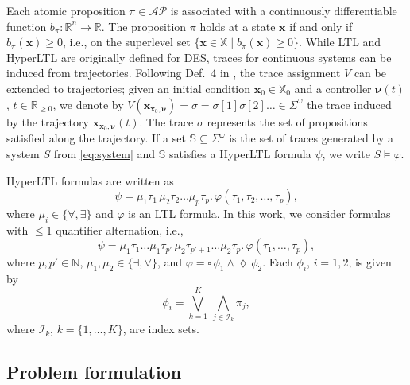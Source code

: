 \documentclass[letterpaper, 10 pt, conference]{ieeeconf}  %
\begin{document}
Each atomic proposition $\pi \in \mathcal{AP}$ is associated with a continuously differentiable function $b_\pi: \mathbb{R}^n \to \mathbb{R}$. The proposition $\pi$ holds at a state $\mathbf{x}$ if and only if $b_\pi(\mathbf{x}) \ge 0$, i.e., on the superlevel set $\{\mathbf{x} \in \mathbb{X} \mid b_\pi(\mathbf{x}) \ge 0 \}$. While LTL and HyperLTL are originally defined for DES, traces for continuous systems can be induced from trajectories. Following Def.~4 in \cite{kloetzer2008}, the trace assignment $V$ can be extended to trajectories; given an initial condition $\mathbf{x}_0 \in \mathbb{X}_0$ and a controller $\boldsymbol{\nu}(t)$, $t \in \mathbb{R}_{\ge 0}$, we denote by $V(\mathbf{x}_{\mathbf{x}_0, \boldsymbol{\nu}}) = \sigma = \sigma[1] \sigma[2] \dots \in \Sigma^\omega$ the trace induced by the trajectory $\mathbf{x}_{\mathbf{x}_0, \boldsymbol{\nu}}(t)$. The trace $\sigma$ represents the set of propositions satisfied along the trajectory. If a set $\mathbb{S} \subseteq \Sigma^\omega$ is the set of traces generated by a system $S$ from \eqref{eq:system} and $\mathbb{S}$ satisfies a HyperLTL formula $\psi$, we write $S \models \varphi$.

HyperLTL formulas are written as
\begin{equation*} 
    \psi = \mu_1 \tau_1 \, \mu_2 \tau_2 \dots \mu_p \tau_p. \, \varphi(\tau_1, \tau_2, \dots, \tau_p), 
\end{equation*}
where $\mu_i \in \{\forall, \exists\}$ and $\varphi$ is an LTL formula. In this work, we consider formulas with $\le 1$ quantifier alternation, i.e.,  
\begin{equation} \label{eq:hyperltl_formula}
    \psi = \mu_1 \tau_1  \dots \mu_1 \tau_{p'} \, \mu_2 \tau_{p'+1} \dots \mu_2 \tau_p. \, \varphi(\tau_1, \dots, \tau_p), 
\end{equation}
where $p, p' \in \mathbb{N}$, $\mu_1, \mu_2 \in \{\exists, \forall \}$, and $\varphi = \square \, \phi_1 \land \lozenge \, \phi_2$. Each $\phi_i$, $i = 1,2$, is given by
\begin{equation} \label{eq:hyperltl_subformula}
    \phi_i = \bigvee_{k=1}^K \, \bigwedge_{j \in \mathcal{I}_k} \pi_j,
\end{equation}
where $\mathcal{I}_k$, $k = \{1, \dots, K\}$, are index sets.

\subsection{Problem formulation}
\end{document}
